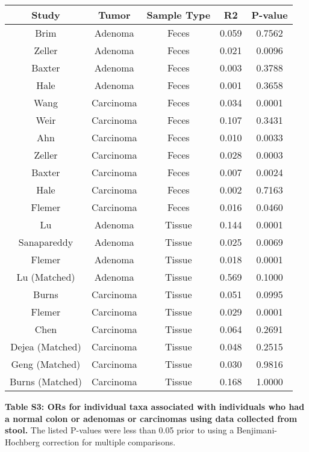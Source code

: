 \documentclass[12pt,]{article}
\begin{document}
\begin{longtable}[]{@{}ccccc@{}}
\toprule
Study & Tumor & Sample Type & R2 & P-value\tabularnewline
\midrule
\endhead
Brim & Adenoma & Feces & 0.059 & 0.7562\tabularnewline
Zeller & Adenoma & Feces & 0.021 & 0.0096\tabularnewline
Baxter & Adenoma & Feces & 0.003 & 0.3788\tabularnewline
Hale & Adenoma & Feces & 0.001 & 0.3658\tabularnewline
Wang & Carcinoma & Feces & 0.034 & 0.0001\tabularnewline
Weir & Carcinoma & Feces & 0.107 & 0.3431\tabularnewline
Ahn & Carcinoma & Feces & 0.010 & 0.0033\tabularnewline
Zeller & Carcinoma & Feces & 0.028 & 0.0003\tabularnewline
Baxter & Carcinoma & Feces & 0.007 & 0.0024\tabularnewline
Hale & Carcinoma & Feces & 0.002 & 0.7163\tabularnewline
Flemer & Carcinoma & Feces & 0.016 & 0.0460\tabularnewline
Lu & Adenoma & Tissue & 0.144 & 0.0001\tabularnewline
Sanapareddy & Adenoma & Tissue & 0.025 & 0.0069\tabularnewline
Flemer & Adenoma & Tissue & 0.018 & 0.0001\tabularnewline
Lu (Matched) & Adenoma & Tissue & 0.569 & 0.1000\tabularnewline
Burns & Carcinoma & Tissue & 0.051 & 0.0995\tabularnewline
Flemer & Carcinoma & Tissue & 0.029 & 0.0001\tabularnewline
Chen & Carcinoma & Tissue & 0.064 & 0.2691\tabularnewline
Dejea (Matched) & Carcinoma & Tissue & 0.048 & 0.2515\tabularnewline
Geng (Matched) & Carcinoma & Tissue & 0.030 & 0.9816\tabularnewline
Burns (Matched) & Carcinoma & Tissue & 0.168 & 1.0000\tabularnewline
\bottomrule
\end{longtable}

\newpage

\textbf{Table S3: ORs for individual taxa associated with individuals
who had a normal colon or adenomas or carcinomas using data collected
from stool.} The listed P-values were less than 0.05 prior to using a
Benjimani-Hochberg correction for multiple comparisons.

\scriptsize
\end{document}
